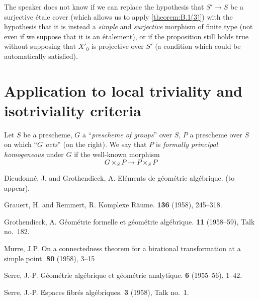 \documentclass{article}
\theoremstyle{plain}
\theoremstyle{definition}
\newcommand{\oldpage}[1]{\marginpar{\footnotesize$\Big\vert$ \textit{p.~#1}}}
\begin{document}
\begin{remarks*}
  The speaker does not know if we can replace the hypothesis that $S'\to S$ be a surjective \'{e}tale cover (which allows us to apply \cref{theorem:B.1(3)}) with the hypothesis that it is instead a \emph{simple} and \emph{surjective} morphism of finite type (not even if we suppose that it is an \'{e}talement), or if the proposition still holds true without supposing that $X'_0$ is projective over $S'$ (a condition which could be automatically satisfied).
\end{remarks*}


\section{Application to local triviality and isotriviality criteria}
\label{B.6}

Let $S$ be a prescheme, $G$ a ``\emph{prescheme of groups}'' over $S$, $P$ a prescheme over $S$ on which ``\emph{$G$ acts}'' (on the right).
We say that $P$ is \emph{formally principal homogeneous} under $G$ if the well-known morphism
\[
  G\times_S P \to P\times_S P
\]
\oldpage{190-27}






\nocite{*}
\begin{thebibliography}{6}

  {\sc Dieudonn\'{e}, J. and Grothendieck, A.}
  \newblock El\'{e}ments de g\'{e}om\'{e}trie alg\'{e}brique.
   (to appear).

  {\sc Grauert, H. and Remmert, R.}
  \newblock Komplexe R\"{a}ume.
   \textbf{136} (1958), 245--318.

  {\sc Grothendieck, A.}
  \newblock G\'{e}om\'{e}trie formelle et g\'{e}om\'{e}trie alg\'{e}brique.
   \textbf{11} (1958--59), Talk no.~182.

  {\sc Murre, J.P.}
  \newblock On a connectedness theorem for a birational transformation at a simple point.
   \textbf{80} (1958), 3--15

  {\sc Serre, J.-P.}
  \newblock G\'{e}om\'{e}trie alg\'{e}brique et g\'{e}om\'{e}trie analytique.
   \textbf{6} (1955--56), 1--42.

  {\sc Serre, J.-P.}
  \newblock Espaces fibr\'{e}s alg\'{e}briques.
   \textbf{3} (1958), Talk no.~1.

\end{thebibliography}
\end{document}
